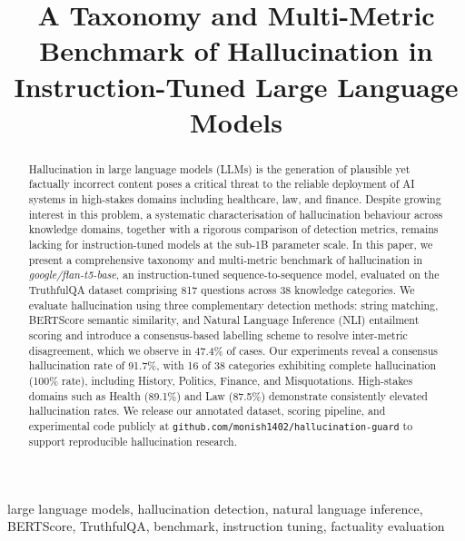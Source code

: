 \documentclass[conference]{IEEEtran}
\begin{document}
\title{A Taxonomy and Multi-Metric Benchmark of Hallucination
in Instruction-Tuned Large Language Models}

\author{
}

\maketitle

\begin{abstract}
Hallucination in large language models (LLMs) is the generation
of plausible yet factually incorrect content poses a critical
threat to the reliable deployment of AI systems in high-stakes
domains including healthcare, law, and finance.
Despite growing interest in this problem, a systematic
characterisation of hallucination behaviour across knowledge
domains, together with a rigorous comparison of detection
metrics, remains lacking for instruction-tuned models at the
sub-1B parameter scale.
In this paper, we present a comprehensive taxonomy and
multi-metric benchmark of hallucination in
\textit{google/flan-t5-base}, an instruction-tuned
sequence-to-sequence model, evaluated on the TruthfulQA
dataset comprising 817 questions across 38 knowledge categories.
We evaluate hallucination using three complementary detection
methods: string matching, BERTScore semantic similarity, and
Natural Language Inference (NLI) entailment scoring and
introduce a consensus-based labelling scheme to resolve
inter-metric disagreement, which we observe in 47.4\% of cases.
Our experiments reveal a consensus hallucination rate of 91.7\%,
with 16 of 38 categories exhibiting complete hallucination
(100\% rate), including History, Politics, Finance, and
Misquotations.
High-stakes domains such as Health (89.1\%) and Law (87.5\%)
demonstrate consistently elevated hallucination rates.
We release our annotated dataset, scoring pipeline, and
experimental code publicly at
\texttt{github.com/monish1402/hallucination-guard}
to support reproducible hallucination research.
\end{abstract}

\begin{IEEEkeywords}
large language models, hallucination detection, natural language
inference, BERTScore, TruthfulQA, benchmark, instruction tuning,
factuality evaluation
\end{IEEEkeywords}
\end{document}
